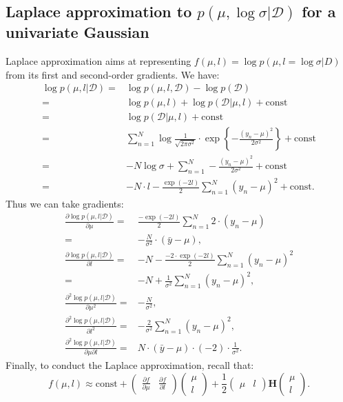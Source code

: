 \documentclass[UTF8]{ctexart}
\begin{document}
\subsection{Laplace approximation to $p(\mu,\log \sigma|\mathcal{D})$ for a univariate Gaussian}
Laplace approximation aims at representing $f(\mu,l)=\log p(\mu,l=\log \sigma|D)$ from its first and second-order gradients. 
We have:
$$
\begin{aligned}
\log p(\mu,l|\mathcal{D})=&\log p(\mu,l,\mathcal{D})-\log p(\mathcal{D})\\
=&\log p(\mu,l) + \log p(\mathcal{D}|\mu,l) + \text{const} \\
=&\log p(\mathcal{D}|\mu,l) + \text{const} \\
=&\sum_{n=1}^{N}\log \frac{1}{\sqrt{2\pi\sigma^{2}}}\cdot\exp\left\{-\frac{(y_{n}-\mu)^{2}}{2\sigma^{2}}  \right\}+\text{const} \\
=&-N\log \sigma+\sum_{n=1}^{N}-\frac{(y_{n}-\mu)^{2}}{2\sigma^{2}}+\text{const}\\
=&-N\cdot l-\frac{\exp(-2l)}{2}\sum_{n=1}^{N}(y_{n}-\mu)^{2}+\text{const}.
\end{aligned}
$$
Thus we can take gradients:
\begin{align}
\frac{\partial \log p(\mu,l|\mathcal{D})}{\partial \mu}=&\frac{-\exp(-2l)}{2}\sum_{n=1}^{N}2\cdot (y_{n}-\mu) \nonumber \\
=&-\frac{N}{\sigma^{2}}\cdot (\bar{y}-\mu),\nonumber \\
\frac{\partial \log p(\mu,l|\mathcal{D})}{\partial l}=&-N - \frac{-2\cdot\exp(-2l)}{2}\sum_{n=1}^{N}(y_{n}-\mu)^{2} \nonumber \\
=&-N+\frac{1}{\sigma^{2}}\sum_{n=1}^{N}(y_{n}-\mu)^{2}, \nonumber \\
\frac{\partial^{2} \log p(\mu,l|\mathcal{D})}{\partial \mu^{2}}=&-\frac{N}{\sigma^{2}}, \nonumber \\
\frac{\partial^{2} \log p(\mu,l|\mathcal{D})}{\partial l^{2}}=&-\frac{2}{\sigma^{2}}\sum_{n=1}^{N}(y_{n}-\mu)^{2}, \nonumber \\
\frac{\partial^{2} \log p(\mu,l|\mathcal{D})}{\partial \mu \partial l}=&N\cdot (\bar{y}-\mu)\cdot (-2) \cdot \frac{1}{\sigma^{2}}. \nonumber
\end{align}
Finally, to conduct the Laplace approximation, recall that:
$$f(\mu,l)\approx \text{const}+
\begin{pmatrix}
\frac{\partial f}{\partial \mu} & \frac{\partial f}{\partial l}
\end{pmatrix}
\begin{pmatrix}
\mu \\
l
\end{pmatrix}+\frac{1}{2}
\begin{pmatrix}
\mu & l
\end{pmatrix}
\textbf{H}
\begin{pmatrix}
\mu \\
l
\end{pmatrix}.
$$
\end{document}
